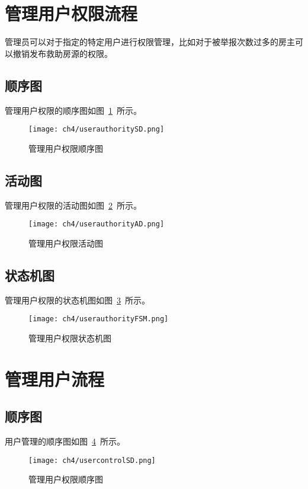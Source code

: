 \section{管理用户权限流程}
管理员可以对于指定的特定用户进行权限管理，比如对于被举报次数过多的房主可以撤销发布救助房源的权限。
\subsection{顺序图}
管理用户权限的顺序图如图~\ref{fig:userauthoritySD}~所示。
\begin{figure}[htbp]
    \centering
    \texttt{[image: ch4/userauthoritySD.png]}
    \caption{管理用户权限顺序图}\label{fig:userauthoritySD}
    \vspace{\baselineskip} %
\end{figure}
\subsection{活动图}
管理用户权限的活动图如图~\ref{fig:userauthorityAD}~所示。
\begin{figure}[htbp]
    \centering
    \texttt{[image: ch4/userauthorityAD.png]}
    \caption{管理用户权限活动图}\label{fig:userauthorityAD}
    \vspace{\baselineskip} %
\end{figure}
\subsection{状态机图}
管理用户权限的状态机图如图~\ref{fig:userauthorityFSM}~所示。
\begin{figure}[htbp]
    \centering
    \texttt{[image: ch4/userauthorityFSM.png]}
    \caption{管理用户权限状态机图}\label{fig:userauthorityFSM}
    \vspace{\baselineskip} %
\end{figure}

\section{管理用户流程}

\subsection{顺序图}
用户管理的顺序图如图~\ref{fig:usercontrolSD}~所示。
\begin{figure}[htbp]
    \centering
    \texttt{[image: ch4/usercontrolSD.png]}
    \caption{管理用户权限顺序图}\label{fig:usercontrolSD}
    \vspace{\baselineskip} %
\end{figure}
